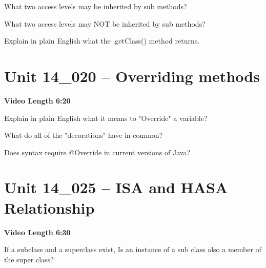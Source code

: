 \documentclass[letterpaper,12pt]{exam}
\newcommand{\unit}{Unit 14}
\begin{document}
\begin{questions}
\begin{samepage}
    \question What two access levels may be inherited by sub methods?
    \vspace{5mm}
\end{samepage}
\begin{samepage}
    \question What two access levels may NOT be inherited by sub methods?
    \vspace{5mm}
\end{samepage}

\begin{samepage}
    \question Explain in plain English what the .getClass() method returns.
    \vspace{5mm}
\end{samepage}


\section*{\unit\_020 -- Overriding methods } 
\par{\selectfont\textbf{Video Length 6:20}}

\begin{samepage}
    \question Explain in plain English what it means to "Override" a variable?
    \vspace{5mm}
\end{samepage}

\begin{samepage}
    \question What do all of the "decorations" have in common?
    \vspace{5mm}
\end{samepage}

\begin{samepage}
    \question Does syntax require @Override in current versions of Java?
    \vspace{5mm}
\end{samepage}




\section*{\unit\_025 -- ISA and HASA Relationship } 
\par{\selectfont\textbf{Video Length 6:30}}

\begin{samepage}
    \question If a subclass and a superclass exist, Is an instance of a sub class also a member of the super class?
    \vspace{5mm}
\end{samepage}


\end{questions}
\end{document}
